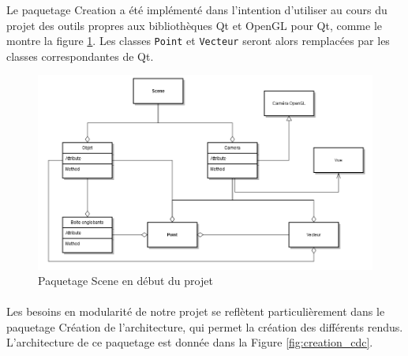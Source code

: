 \clearpage
Le paquetage Creation a été implémenté dans l'intention d'utiliser au cours du projet des outils propres aux bibliothèques Qt et OpenGL pour Qt, comme le montre la figure \ref{fig:scene_cdc}. Les classes \texttt{Point} et \texttt{Vecteur} seront alors remplacées par les classes correspondantes de Qt.

\begin{figure}[H]
	\centering      
	\includegraphics[scale=0.5]{old_scene.png}
	\caption{\label{fig:scene_cdc}  Paquetage Scene en début du projet \protect \footnotemark }
\end{figure}

\paragraph{}
        Les besoins en modularité de notre projet se reflètent particulièrement dans le paquetage Création de l'architecture, qui permet la création des différents rendus. L'architecture de ce paquetage est donnée dans la Figure \ref{fig:creation_cdc}.

